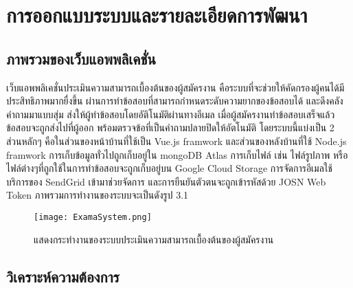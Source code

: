 \chapter{การออกแบบระบบและรายละเอียดการพัฒนา}
\label{chapter:experiment}

\section{ภาพรวมของเว็บแอพพลิเคชั่น}

เว็บแอพพลิเคชั่นประเมินความสามารถเบื้องต้นของผู้สมัครงาน คือระบบที่จะช่วยให้คัดกรองผู้คนได้มีประสิทธิภาพมากยื่งขึ้น ผ่านการทำข้อสอบที่สามารถกำหนดระดับความยากของข้อสอบได้ และดึงคลังคำถามมาแบบสุ่ม ส่งให้ผู้ทำข้อสอบโดยอัติโนมัติผ่านทางอีเมล เมื่อผู้สมัครงานทำข้อสอบเสร็จแล้ว ข้อสอบจะถูกส่งไปที่ผู้ออก พร้อมตรวจข้อที่เป็นคำถามปลายปิดให้อัตโนมัติ โดยระบบนี้แบ่งเป็น 2 ส่วนหลักๆ คือในส่วนของหน้าบ้านที่ใช้เป็น Vue.js framwork และส่วนของหลังบ้านที่ใช้ Node.js framwork การเก็บข้อมูลทั่วไปถูกเก็บอยู่ใน mongoDB Atlas การเก็บไฟล์ เช่น ไฟล์รูปภาพ หรือไฟล์ต่างๆที่ถูกใช้ในการทำข้อสอบจะถูกเก็บอยู่บน Google Cloud Storage การจัดการอีเมลใช้บริการของ SendGrid เข้ามาช่วยจัดการ และการยืนยันตัวตนจะถูกเข้ารหัสด้วย JOSN Web Token ภาพรวมการทำงานของระบบจะเป็นดังรูป 3.1

\begin{figure}[H]
  \centering
  \texttt{[image: ExamaSystem.png]}
  \caption{แสดงกระทำงานของระบบประเมินความสามารถเบื้องต้นของผู้สมัครงาน}
  \label{Fig:ExamaSystem}
\end{figure}

\newpage
\section{วิเคราะห์ความต้องการ}

